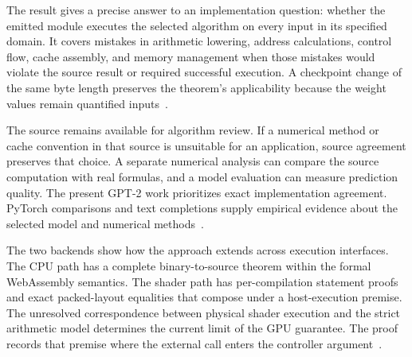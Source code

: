 The result gives a precise answer to an implementation question: whether the emitted module executes the selected algorithm on every input in its specified domain.  It covers mistakes in arithmetic lowering, address calculations, control flow, cache assembly, and memory management when those mistakes would violate the source result or required successful execution.  A checkpoint change of the same byte length preserves the theorem's applicability because the weight values remain quantified inputs~\cite{session,artifact}.

The source remains available for algorithm review.  If a numerical method or cache convention in that source is unsuitable for an application, source agreement preserves that choice.  A separate numerical analysis can compare the source computation with real formulas, and a model evaluation can measure prediction quality.  The present GPT-2 work prioritizes exact implementation agreement.  PyTorch comparisons and text completions supply empirical evidence about the selected model and numerical methods~\cite{tests,testcode}.

The two backends show how the approach extends across execution interfaces.  The CPU path has a complete binary-to-source theorem within the formal WebAssembly semantics.  The shader path has per-compilation statement proofs and exact packed-layout equalities that compose under a host-execution premise.  The unresolved correspondence between physical shader execution and the strict arithmetic model determines the current limit of the GPU guarantee.  The proof records that premise where the external call enters the controller argument~\cite{wg-backend,wg-execution}.
